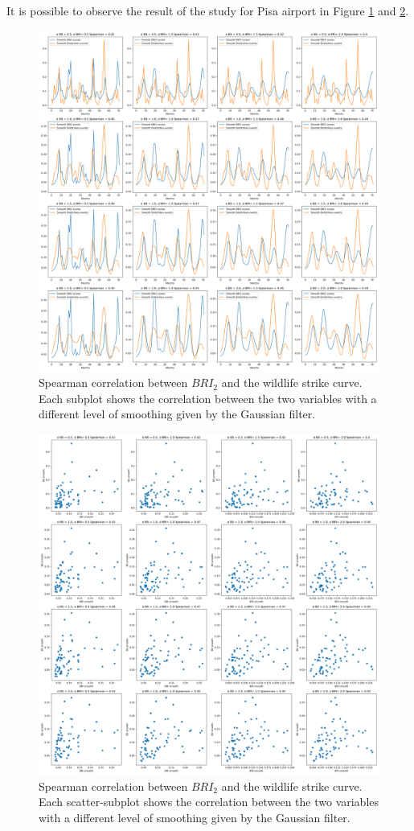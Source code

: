It is possible to observe the result of the study for Pisa airport in Figure \ref{corr_curve} and \ref{corr_scatter}.
\begin{figure}
	\centering
	\includegraphics[width=14cm]{img/corr_curve.png}
	\caption{Spearman correlation between $BRI_2$ and the wildlife strike curve. Each subplot shows the correlation between the two variables with a different level of smoothing given by the Gaussian filter.}
	\label{corr_curve}
\end{figure}
\begin{figure}
	\centering
	\includegraphics[width=14cm]{img/corr_scatter.png}
	\caption{Spearman correlation between $BRI_2$ and the wildlife strike curve. Each scatter-subplot shows the correlation between the two variables with a different level of smoothing given by the Gaussian filter.}
	\label{corr_scatter}
\end{figure}
